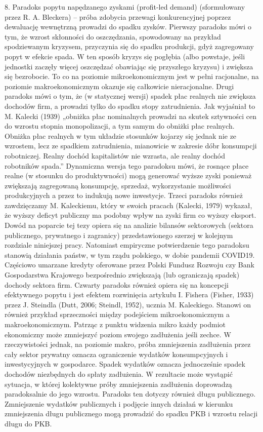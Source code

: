 \documentclass[
]{book}
\begin{document}
8. Paradoks popytu napędzanego zyskami (profit-led demand) (sformułowany przez R. A. Bleckera) -- próba zdobycia przewagi konkurencyjnej poprzez dewaluację wewnętrzną prowadzi do spadku zysków.
Pierwszy paradoks mówi o tym, że wzrost skłonności do oszczędzania, spowodowany na przykład spodziewanym kryzysem, przyczynia się do spadku produkcji, gdyż zagregowany popyt w efekcie spada. W ten sposób kryzys się pogłębia (albo powstaje, jeśli jednostki zaczęły więcej oszczędzać obawiając się przyszłego kryzysu) i zwiększa się bezrobocie. To co na poziomie mikroekonomicznym jest w pełni racjonalne, na poziomie makroekonomicznym okazuje się całkowicie nieracjonalne.
Drugi paradoks mówi o tym, że (w statycznej wersji) spadek płac realnych nie zwiększa dochodów firm, a prowadzi tylko do spadku stopy zatrudnienia. Jak wyjaśniał to M. Kalecki (1939) „obniżka płac nominalnych prowadzi na skutek sztywności cen do wzrostu stopnia monopolizacji, a tym samym do obniżki płac realnych. Obniżka płac realnych w tym układzie stosunków kojarzy się jednak nie ze wzrostem, lecz ze spadkiem zatrudnienia, mianowicie w zakresie dóbr konsumpcji robotniczej. Realny dochód kapitalistów nie wzrasta, ale realny dochód robotników spada.'' Dynamiczna wersja tego paradoksu mówi, że rosnące płace realne (w stosunku do produktywności) mogą generować wyższe zyski ponieważ zwiększają zagregowaną konsumpcję, sprzedaż, wykorzystanie możliwości produkcyjnych a przez to indukują nowe inwestycje.
Trzeci paradoks również zawdzięczamy M. Kaleckiemu, który w swoich pracach (Kalecki, 1979) wykazał, że wyższy deficyt publiczny ma podobny wpływ na zyski firm co wyższy eksport. Dowód na poparcie tej tezy opiera się na analizie bilansów sektorowych (sektora publicznego, prywatnego i zagranicy) przedstawionego szerzej w kolejnym rozdziale niniejszej pracy. Natomiast empiryczne potwierdzenie tego paradoksu stanowią działania państw, w tym rządu polskiego, w dobie pandemii COVID19. Częściowo umarzane kredyty oferowane przez Polski Fundusz Rozwoju czy Bank Gospodarstwa Krajowego bezpośrednio zwiększają (lub ograniczają spadek) dochody sektora firm.
Czwarty paradoks również opiera się na koncepcji efektywnego popytu i jest efektem rozwinięcia artykułu I. Fishera (Fisher, 1933) przez J. Steindla (Dutt, 2006; Steindl, 1952), ucznia M. Kaleckiego. Stanowi on również przykład sprzeczności między podejściem mikroekonomicznym a makroekonomicznym. Patrząc z punktu widzenia mikro każdy podmiot ekonomiczny może zmniejszyć poziom swojego zadłużenia jeśli zechce. W rzeczywistości jednak, na poziomie makro, próba zmniejszenia zadłużenia przez cały sektor prywatny oznacza ograniczenie wydatków konsumpcyjnych i inwestycyjnych w gospodarce. Spadek wydatków oznacza jednocześnie spadek dochodów niezbędnych do spłaty zadłużenia. W rezultacie może wystąpić sytuacja, w której kolektywne próby zmniejszenia zadłużenia doprowadzą paradoksalnie do jego wzrostu. Paradoks ten dotyczy również długu publicznego. Zmniejszenie wydatków publicznych i podjęcie innych działań w kierunku zmniejszenia długu publicznego mogą prowadzić do spadku PKB i wzrostu relacji długu do PKB.
\end{document}
